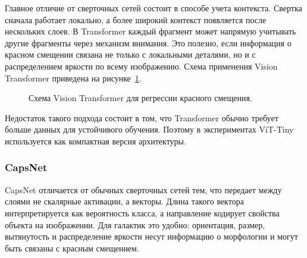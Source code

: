 \documentclass[12pt,a4paper]{article}
\begin{document}
Главное отличие от сверточных сетей состоит в способе учета контекста. Свертка сначала работает локально, а более широкий контекст появляется после нескольких слоев. В Transformer каждый фрагмент может напрямую учитывать другие фрагменты через механизм внимания. Это полезно, если информация о красном смещении связана не только с локальными деталями, но и с распределением яркости по всему изображению. Схема применения Vision Transformer приведена на рисунке~\ref{fig:vit-scheme}.

\begin{figure}[h]
\centering
{}
\caption{Схема Vision Transformer для регрессии красного смещения.}
\label{fig:vit-scheme}
\end{figure}

Недостаток такого подхода состоит в том, что Transformer обычно требует больше данных для устойчивого обучения. Поэтому в экспериментах ViT-Tiny используется как компактная версия архитектуры.

\subsubsection{CapsNet}

CapsNet отличается от обычных сверточных сетей тем, что передает между слоями не скалярные активации, а векторы. Длина такого вектора интерпретируется как вероятность класса, а направление кодирует свойства объекта на изображении. Для галактик это удобно: ориентация, размер, вытянутость и распределение яркости несут информацию о морфологии и могут быть связаны с красным смещением.
\end{document}
